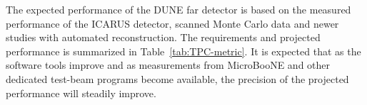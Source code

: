 

The expected performance of the DUNE far detector is based on the measured performance of the ICARUS detector, scanned Monte Carlo data and newer studies with automated reconstruction. The requirements and projected performance is summarized in Table~\ref{tab:TPC-metric}. It is expected that as the software tools improve and as measurements from MicroBooNE and other dedicated test-beam programs become available, the precision of the projected performance will steadily improve.


